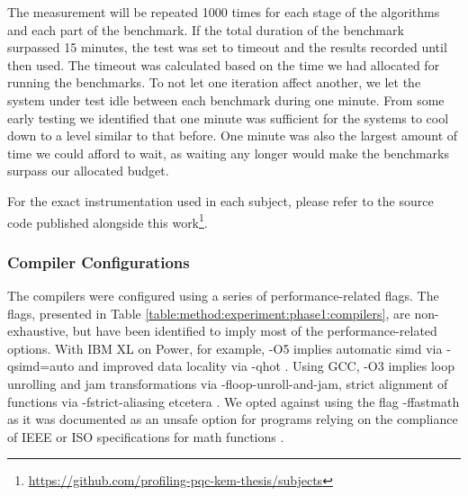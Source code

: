 The measurement will be repeated 1000 times for each stage of the algorithms and each part of the benchmark. If the total duration of the benchmark surpassed 15 minutes, the test was set to timeout and the results recorded until then used. The timeout was calculated based on the time we had allocated for running the benchmarks. To not let one iteration affect another, we let the system under test idle between each benchmark during one minute. From some early testing we identified that one minute was sufficient for the systems to cool down to a level similar to that before. One minute was also the largest amount of time we could afford to wait, as waiting any longer would make the benchmarks surpass our allocated budget.

For the exact instrumentation used in each subject, please refer to the source code published alongside this work\footnote{\href{https://github.com/profiling-pqc-kem-thesis/subjects}{https://github.com/profiling-pqc-kem-thesis/subjects}}.

\subsubsection{Compiler Configurations}
\label{section:method:experiment:phase1:compiler-configurations}

The compilers were configured using a series of performance-related flags. The flags, presented in Table \ref{table:method:experiment:phase1:compilers}, are non-exhaustive, but have been identified to imply most of the performance-related options. With IBM XL on Power, for example, -O5 implies automatic \gls{simd} via -qsimd=auto and improved data locality via -qhot \cite{ibmxl2018}. Using GCC, -O3 implies loop unrolling and jam transformations via -floop-unroll-and-jam, strict alignment of functions via -fstrict-aliasing etcetera \cite{gcc2021}. We opted against using the flag -ffastmath as it was documented as an unsafe option for programs relying on the compliance of IEEE or ISO specifications for math functions \cite{gcc2021}.

